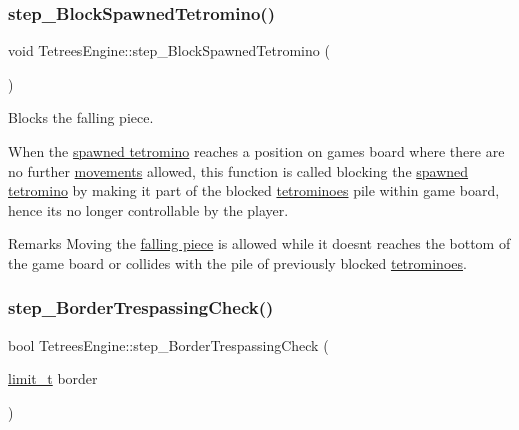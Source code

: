 \subsubsection{\texorpdfstring{step\+\_\+\+Block\+Spawned\+Tetromino()}{step\_BlockSpawnedTetromino()}}
{\footnotesize\ttfamily void Tetrees\+Engine\+::step\+\_\+\+Block\+Spawned\+Tetromino (\begin{DoxyParamCaption}{ }\end{DoxyParamCaption})\hspace{0.3cm}{\ttfamily [private]}}



Blocks the falling piece. 

When the \hyperlink{classTetreesEngine_a26435ee2f02d9ba70d9e359745114f6e}{spawned tetromino} reaches a position on game\textquotesingle{}s board where there are no further \hyperlink{TetreesDefs_8hpp_a4d5a793092a473f85b4c1f7faf62afed}{movements} allowed, this function is called blocking the \hyperlink{classTetreesEngine_a26435ee2f02d9ba70d9e359745114f6e}{spawned tetromino} by making it part of the blocked \hyperlink{TetreesDefs_8hpp_adf4f8e2cbbd7d8894fe3beda39db1b8f}{tetrominoes} pile within game board, hence it\textquotesingle{}s no longer controllable by the player. \begin{DoxyRemark}{Remarks}
Moving the \hyperlink{classTetreesEngine_a26435ee2f02d9ba70d9e359745114f6e}{falling piece} is allowed while it doesn\textquotesingle{}t reaches the bottom of the game board or collides with the pile of previously blocked \hyperlink{TetreesDefs_8hpp_adf4f8e2cbbd7d8894fe3beda39db1b8f}{tetrominoes}. 
\end{DoxyRemark}
\mbox{\label{classTetreesEngine_aa593f5f688e984a2cdbbf83b162d00a2}} 
\subsubsection{\texorpdfstring{step\+\_\+\+Border\+Trespassing\+Check()}{step\_BorderTrespassingCheck()}}
{\footnotesize\ttfamily bool Tetrees\+Engine\+::step\+\_\+\+Border\+Trespassing\+Check (\begin{DoxyParamCaption}\item[{\hyperlink{TetreesDefs_8hpp_a5dbb1ebfe8a9b95707ac161d3549ed8a}{limit\+\_\+t}}]{border }\end{DoxyParamCaption})\hspace{0.3cm}{\ttfamily [private]}}




